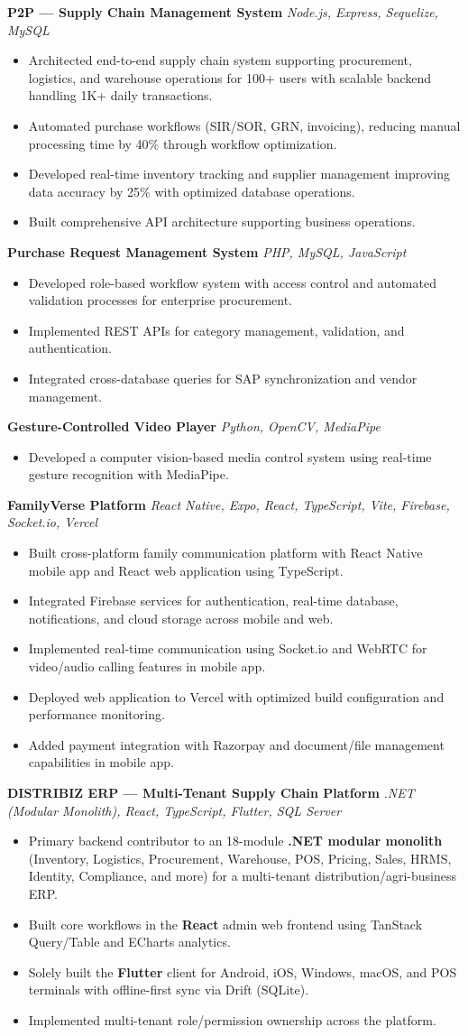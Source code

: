 \documentclass[letterpaper,10pt]{article}
\newcommand{\resumeItem}[1]{\item \small{#1}}
\newcommand{\resumeItemListStart}{\begin{itemize}[leftmargin=*, noitemsep, label={\color{accent}\textbullet}]}
\newcommand{\resumeItemListEnd}{\end{itemize}}
\begin{document}
\textbf{P2P — Supply Chain Management System}
\textit{\color{muted}Node.js, Express, Sequelize, MySQL}
\resumeItemListStart
\resumeItem{Architected end-to-end supply chain system supporting procurement, logistics, and warehouse operations for 100+ users with scalable backend handling 1K+ daily transactions.}
\resumeItem{Automated purchase workflows (SIR/SOR, GRN, invoicing), reducing manual processing time by 40\% through workflow optimization.}
\resumeItem{Developed real-time inventory tracking and supplier management improving data accuracy by 25\% with optimized database operations.}
\resumeItem{Built comprehensive API architecture supporting business operations.}
\resumeItemListEnd

\textbf{Purchase Request Management System}
\textit{\color{muted}PHP, MySQL, JavaScript}
\resumeItemListStart
\resumeItem{Developed role-based workflow system with access control and automated validation processes for enterprise procurement.}
\resumeItem{Implemented REST APIs for category management, validation, and authentication.}
\resumeItem{Integrated cross-database queries for SAP synchronization and vendor management.}
\resumeItemListEnd

\textbf{Gesture-Controlled Video Player}
\textit{\color{muted}Python, OpenCV, MediaPipe}
\resumeItemListStart
\resumeItem{Developed a computer vision-based media control system using real-time gesture recognition with MediaPipe.}
\resumeItemListEnd

\textbf{FamilyVerse Platform}
\textit{\color{muted}React Native, Expo, React, TypeScript, Vite, Firebase, Socket.io, Vercel}
\resumeItemListStart
\resumeItem{Built cross-platform family communication platform with React Native mobile app and React web application using TypeScript.}
\resumeItem{Integrated Firebase services for authentication, real-time database, notifications, and cloud storage across mobile and web.}
\resumeItem{Implemented real-time communication using Socket.io and WebRTC for video/audio calling features in mobile app.}
\resumeItem{Deployed web application to Vercel with optimized build configuration and performance monitoring.}
\resumeItem{Added payment integration with Razorpay and document/file management capabilities in mobile app.}
\resumeItemListEnd

\textbf{DISTRIBIZ ERP --- Multi-Tenant Supply Chain Platform}
\textit{\color{muted}.NET (Modular Monolith), React, TypeScript, Flutter, SQL Server}
\resumeItemListStart
\resumeItem{Primary backend contributor to an 18-module \textbf{.NET modular monolith} (Inventory, Logistics, Procurement, Warehouse, POS, Pricing, Sales, HRMS, Identity, Compliance, and more) for a multi-tenant distribution/agri-business ERP.}
\resumeItem{Built core workflows in the \textbf{React} admin web frontend using TanStack Query/Table and ECharts analytics.}
\resumeItem{Solely built the \textbf{Flutter} client for Android, iOS, Windows, macOS, and POS terminals with offline-first sync via Drift (SQLite).}
\resumeItem{Implemented multi-tenant role/permission ownership across the platform.}
\resumeItemListEnd
\end{document}
